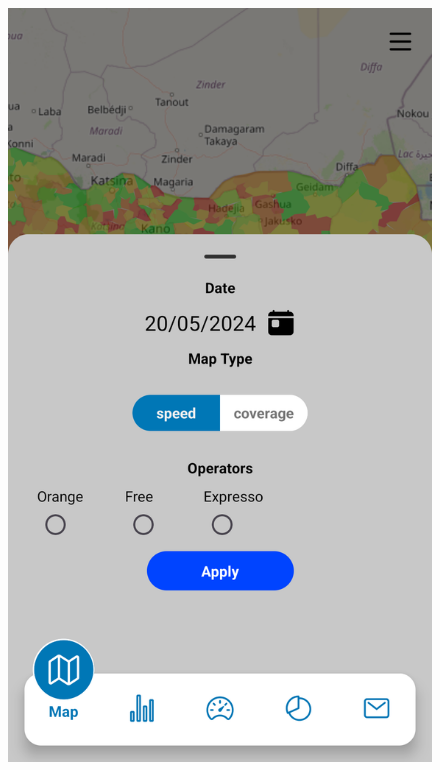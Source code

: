 \begin{figure}[H]
\begin{minipage}{0.32\textwidth}
    \label{fig:login-form-filled}
\end{minipage}\hfill
\begin{minipage}{0.32\textwidth}
    \centering
    \includegraphics[width=\linewidth]{images/sprint3/speedFilter.png}
    \label{fig:login-form}
\end{minipage}\hfill
\end{figure}
